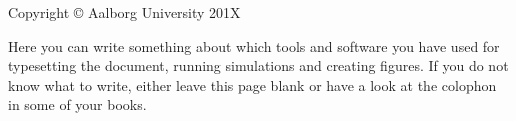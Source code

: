 \thispagestyle{empty}
{\small
\strut\vfill %
\noindent Copyright \copyright{} Aalborg University 201X\par
\vspace{0.2cm}
\noindent Here you can write something about which tools and software you have used for typesetting the document, running simulations and creating figures. If you do not know what to write, either leave this page blank or have a look at the colophon in some of your books.
}
\clearpage

